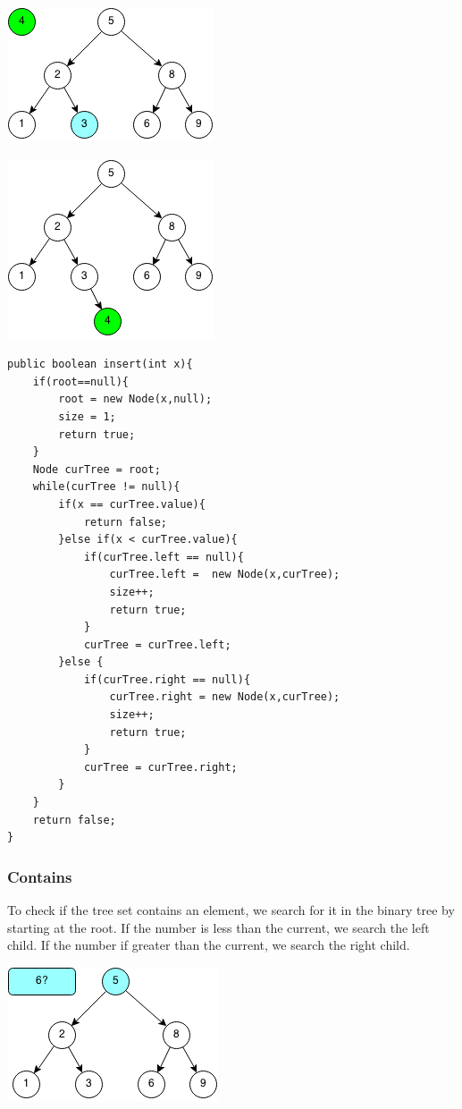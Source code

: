 \documentclass[11pt,oneside]{book}
\makeatletter
\def\maxwidth#1{\ifdim\Gin@nat@width>#1 #1\else\Gin@nat@width\fi}
\makeatother
\begin{document}
\includegraphics[width=\maxwidth{\textwidth}]{bstinsert3.png}

\includegraphics[width=\maxwidth{\textwidth}]{bstinsert4.png}

\begin{lstlisting}
public boolean insert(int x){
    if(root==null){
        root = new Node(x,null);
        size = 1;
        return true;
    }
    Node curTree = root;
    while(curTree != null){
        if(x == curTree.value){
            return false;
        }else if(x < curTree.value){
            if(curTree.left == null){
                curTree.left =  new Node(x,curTree);
                size++;
                return true;
            }
            curTree = curTree.left;
        }else {
            if(curTree.right == null){
                curTree.right = new Node(x,curTree);
                size++;
                return true;
            }
            curTree = curTree.right;
        }
    }
    return false;
}
\end{lstlisting}

\subsubsection{Contains}

To check if the tree set contains an element, we search for it in the binary tree by starting at the root. If the number is less than the current, we search the left child. If the number if greater than the current, we search the right child.

\includegraphics[width=\maxwidth{\textwidth}]{bstcontains.png}
\end{document}
